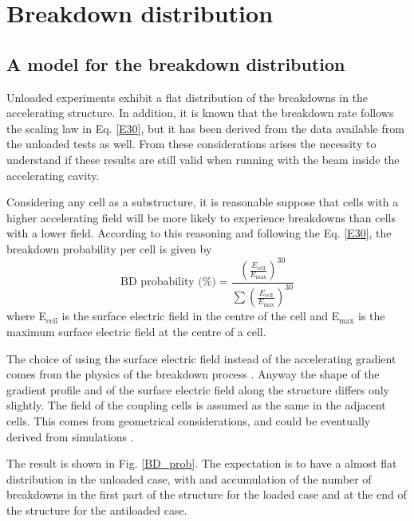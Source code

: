 

\section[Breakdown distribution]{Breakdown distribution}

\subsection[A model for the breakdown distribution]{A model for the breakdown distribution}

Unloaded experiments exhibit a flat distribution of the breakdowns in the accelerating structure. In addition, it is known that the breakdown rate follows the scaling law in Eq. \ref{E30}, but it has been derived from the data available from the unloaded tests as well. From these considerations arises the necessity to understand if these results are still valid when running with the beam inside the accelerating cavity.

Considering any cell as a substructure, it is reasonable suppose that cells with a higher accelerating field will be more likely to experience breakdowns than cells with a lower field. According to this reasoning and following the Eq. \ref{E30}, the breakdown probability per cell is given by
\begin{equation}
\text{BD probability (\%)} =\frac{   \left ( \frac{E_\text{cell}}{E_\text{max}} \right )^{30} }{ \sum \left( \frac{E_\text{cell}}{E_\text{max}} \right )^{30}   }
\end{equation}
where E$_\text{cell}$ is the surface electric field in the centre of the cell and E$_\text{max}$ is the maximum surface electric field at the centre of a cell. 

The choice of using the surface electric field instead of the accelerating gradient comes from the physics of the breakdown process \cite{Walter:PC}. Anyway the shape of the gradient profile and of the surface electric field along the structure differs only slightly. The field of the coupling cells is assumed as the same in the adjacent cells. This comes from geometrical considerations, and could be eventually derived from simulations \cite{Alexej:PC}.

The result is shown in Fig. \ref{BD_prob}. The expectation is to have a almost flat distribution in the unloaded case, with and accumulation of the number of breakdowns in the first part of the structure for the loaded case and at the end of the structure for the antiloaded case.


